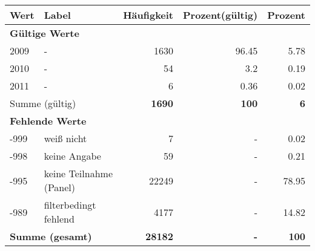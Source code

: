      \begin{longtable}{lXrrr}
     \toprule
     \textbf{Wert} & \textbf{Label} & \textbf{Häufigkeit} & \textbf{Prozent(gültig)} & \textbf{Prozent} \\
     \endhead
     \midrule
     \multicolumn{5}{l}{\textbf{Gültige Werte}}\\

     2009 &
     \multicolumn{1}{X}{ -  } &


       \num{1630} &
       \num[round-mode=places,round-precision=2]{96,45} &
         \num[round-mode=places,round-precision=2]{5,78} \\

     2010 &
     \multicolumn{1}{X}{ -  } &


       \num{54} &
       \num[round-mode=places,round-precision=2]{3,2} &
         \num[round-mode=places,round-precision=2]{0,19} \\

     2011 &
     \multicolumn{1}{X}{ -  } &


       \num{6} &
       \num[round-mode=places,round-precision=2]{0,36} &
         \num[round-mode=places,round-precision=2]{0,02} \\
     \midrule
     \multicolumn{2}{l}{Summe (gültig)} &
       \textbf{\num{1690}} &
     \textbf{100} &
       \textbf{\num[round-mode=places,round-precision=2]{6}} \\
     \multicolumn{5}{l}{\textbf{Fehlende Werte}}\\
       -999 &
       weiß nicht &
         \num{7} &
        - &
         \num[round-mode=places,round-precision=2]{0,02} \\
       -998 &
       keine Angabe &
         \num{59} &
        - &
         \num[round-mode=places,round-precision=2]{0,21} \\
       -995 &
       keine Teilnahme (Panel) &
         \num{22249} &
        - &
         \num[round-mode=places,round-precision=2]{78,95} \\
       -989 &
       filterbedingt fehlend &
         \num{4177} &
        - &
         \num[round-mode=places,round-precision=2]{14,82} \\
     \midrule
     \multicolumn{2}{l}{\textbf{Summe (gesamt)}} &
          \textbf{\num{28182}} &
        \textbf{-} &
        \textbf{100} \\
     \bottomrule
     \end{longtable}
     
